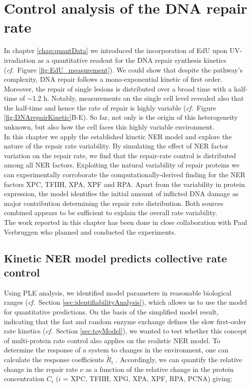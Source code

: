 \chapter{Control analysis of the DNA repair rate}
\label{chap:robustRepair}

In chapter \ref{chap:quantData} we introduced the incorporation of EdU upon UV-irradiation as a quantitative readout for the DNA repair synthesis kinetics (\textit{cf.}\ Figure \ref{fig:EdU_measurement}). We could show that despite the pathway's complexity, DNA repair follows a mono-exponential kinetic of first order. Moreover, the repair of single lesions is distributed over a broad time with a half-time of $\sim$1.2 h. Notably, measurements on the single cell level revealed also that the half-time and hence the rate of repair is highly variable (\textit{cf.}\ Figure \ref{fig:DNArepairKinetic}B-E). So far, not only is the origin of this heterogeneity unknown, but also how the cell faces this highly variable environment.\\  
In this chapter we apply the established kinetic NER model and explore the nature of the repair rate variability. By simulating the effect of NER factor variation on the repair rate, we find that the repair-rate control is distributed among all NER factors. Exploiting the natural variability of repair proteins we can experimentally corroborate the computationally-derived finding for the NER factors XPC, TFIIH, XPA, XPF and RPA. Apart from the variability in protein expression, the model identifies the initial amount of inflicted DNA damage as major contribution determining the repair rate distribution. Both sources combined appears to be sufficient to explain the overall rate variability.\\     

The work reported in this chapter has been done in close collaboration with Paul Verbruggen who planned and conducted the experiments.

\section{Kinetic NER model predicts collective rate control}
\label{sec:repairControl}
Using PLE analysis, we identified model parameters in reasonable biological ranges (\textit{cf.}\ Section \ref{sec:identifiabilityAnalysis}), which allows us to use the model for quantitative predictions. On the basis of the simplified model result, indicating that the fast and random enzyme exchange defines the slow first-order rate kinetics (\textit{cf.}\ Section \ref{sec:toyModel}), we wanted to test whether this concept of multi-protein rate control also applies on the realistic NER model. To determine the response of a system to changes in the environment, one can calculate the response coefficients $\tilde{R}_i$ \label{sec:reponseC} \cite{Hofmeyr1991,Fell1992}. Accordingly, we can quantify the relative change in the repair rate $\nu$ as a function of the relative change in the protein concentration $C_i$ ($i$ = XPC, TFIIH, XPG, XPA, XPF, RPA, PCNA) giving:

